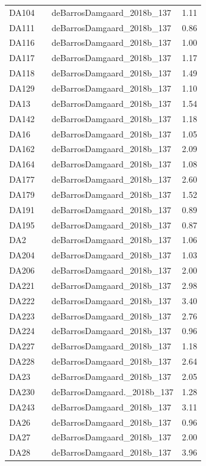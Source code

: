 \begin{longtable}[t]{lllr}
DA104 &  & deBarrosDamgaard\_2018b\_137 & 1.11\\
DA111 &  & deBarrosDamgaard\_2018b\_137 & 0.86\\
DA116 &  & deBarrosDamgaard\_2018b\_137 & 1.00\\
DA117 &  & deBarrosDamgaard\_2018b\_137 & 1.17\\
DA118 &  & deBarrosDamgaard\_2018b\_137 & 1.49\\
DA129 &  & deBarrosDamgaard\_2018b\_137 & 1.10\\
DA13 &  & deBarrosDamgaard\_2018b\_137 & 1.54\\
DA142 &  & deBarrosDamgaard\_2018b\_137 & 1.18\\
DA16 &  & deBarrosDamgaard\_2018b\_137 & 1.05\\
DA162 &  & deBarrosDamgaard\_2018b\_137 & 2.09\\
DA164 &  & deBarrosDamgaard\_2018b\_137 & 1.08\\
DA177 &  & deBarrosDamgaard\_2018b\_137 & 2.60\\
DA179 &  & deBarrosDamgaard\_2018b\_137 & 1.52\\
DA191 &  & deBarrosDamgaard\_2018b\_137 & 0.89\\
DA195 &  & deBarrosDamgaard\_2018b\_137 & 0.87\\
DA2 &  & deBarrosDamgaard\_2018b\_137 & 1.06\\
DA204 &  & deBarrosDamgaard\_2018b\_137 & 1.03\\
DA206 &  & deBarrosDamgaard\_2018b\_137 & 2.00\\
DA221 &  & deBarrosDamgaard\_2018b\_137 & 2.98\\
DA222 &  & deBarrosDamgaard\_2018b\_137 & 3.40\\
DA223 &  & deBarrosDamgaard\_2018b\_137 & 2.76\\
DA224 &  & deBarrosDamgaard\_2018b\_137 & 0.96\\
DA227 &  & deBarrosDamgaard\_2018b\_137 & 1.18\\
DA228 &  & deBarrosDamgaard\_2018b\_137 & 2.64\\
DA23 &  & deBarrosDamgaard\_2018b\_137 & 2.05\\
DA230 &  & deBarrosDamgaard.\_2018b\_137 & 1.28\\
DA243 &  & deBarrosDamgaard\_2018b\_137 & 3.11\\
DA26 &  & deBarrosDamgaard\_2018b\_137 & 0.96\\
DA27 &  & deBarrosDamgaard\_2018b\_137 & 2.00\\
DA28 &  & deBarrosDamgaard\_2018b\_137 & 3.96\\

\end{longtable}
